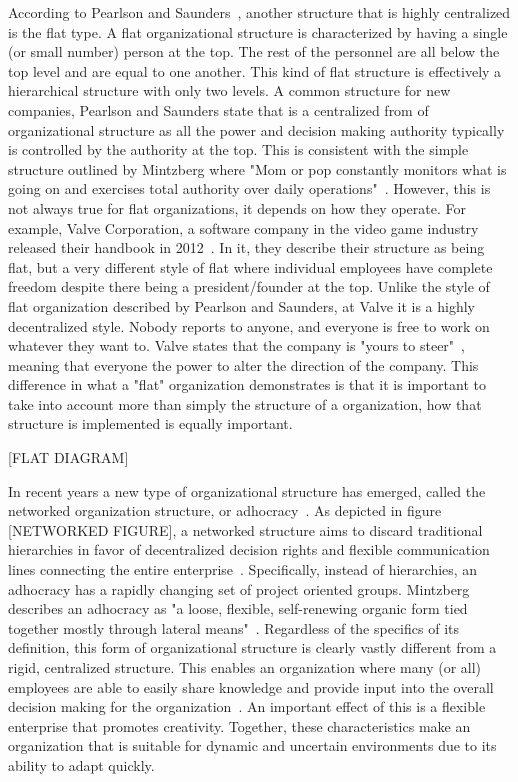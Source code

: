 According to Pearlson and Saunders~\cite{pearlson2009}, another structure that is highly centralized is the flat type. A flat organizational structure is characterized by having a single (or small number) person at the top. The rest of the personnel are all below the top level and are equal to one another. This kind of flat structure is effectively a hierarchical structure with only two levels. A common structure for new companies, Pearlson and Saunders state that is a centralized from of organizational structure as all the power and decision making authority typically is controlled by the authority at the top. This is consistent with the simple structure outlined by Mintzberg where "Mom or pop constantly monitors what is going on and exercises total authority over daily operations"~\cite{Mintzberg1979}. However, this is not always true for flat organizations, it depends on how they operate. For example, Valve Corporation, a software company in the video game industry released their handbook in 2012~\cite{valveHandbook}. In it, they describe their structure as being flat, but a very different style of flat where individual employees have complete freedom despite there being a president/founder at the top. Unlike the style of flat organization described by Pearlson and Saunders, at Valve it is a highly decentralized style. Nobody reports to anyone, and everyone is free to work on whatever they want to. Valve states that the company is "yours to steer"~\cite{valveHandbook}, meaning that everyone the power to alter the direction of the company. This difference in what a "flat" organization demonstrates is that it is important to take into account more than simply the structure of a organization, how that structure is implemented is equally important. 

[FLAT DIAGRAM]

In recent years a new type of organizational structure has emerged, called the networked organization structure, or adhocracy~\cite{applegate1988,pearlson2009}. As depicted in figure [NETWORKED FIGURE], a networked structure aims to discard traditional hierarchies in favor of decentralized decision rights and flexible communication lines connecting the entire enterprise~\cite{applegate1988,pearlson2009}. Specifically, instead of hierarchies, an adhocracy has a rapidly changing set of project oriented groups. Mintzberg describes an adhocracy as "a loose, flexible, self-renewing organic form tied together mostly through lateral means"~\cite{Mintzberg1979}.  Regardless of the specifics of its definition, this form of organizational structure is clearly vastly different from a rigid, centralized structure. This enables an organization where many (or all) employees are able to easily share knowledge and provide input into the overall decision making for the organization~\cite{pearlson2009}. An important effect of this is a flexible enterprise that promotes creativity. Together, these characteristics make an organization that is suitable for dynamic and uncertain environments due to its ability to adapt quickly.


